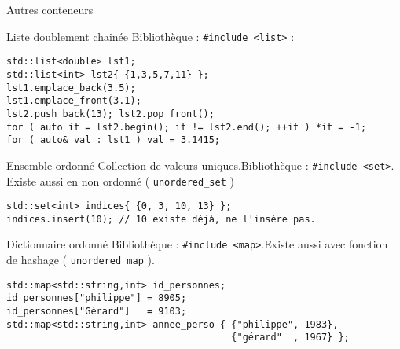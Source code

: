 \documentclass[handout,10pt]{beamer}
\begin{document}
\begin{frame}[fragile]{Autres conteneurs}
\tiny
\begin{block}{Liste doublement chainée}
Bibliothèque : \lstinline{#include <list>} :
\begin{lstlisting}
std::list<double> lst1;
std::list<int> lst2{ {1,3,5,7,11} };
lst1.emplace_back(3.5);
lst1.emplace_front(3.1);
lst2.push_back(13); lst2.pop_front();
for ( auto it = lst2.begin(); it != lst2.end(); ++it ) *it = -1;
for ( auto& val : lst1 ) val = 3.1415;
\end{lstlisting}
\end{block}

\begin{block}{Ensemble ordonné}
Collection de valeurs uniques.Bibliothèque : \lstinline{#include <set>}. Existe aussi en non ordonné ( \lstinline$unordered_set$ )
\begin{lstlisting}
std::set<int> indices{ {0, 3, 10, 13} };
indices.insert(10); // 10 existe déjà, ne l'insère pas.
\end{lstlisting}
\end{block}

\begin{block}{Dictionnaire ordonné}
Bibliothèque : \lstinline{#include <map>}.Existe aussi avec fonction de hashage ( \lstinline$unordered_map$ ).
\begin{lstlisting}
std::map<std::string,int> id_personnes;
id_personnes["philippe"] = 8905;
id_personnes["Gérard"]   = 9103;
std::map<std::string,int> annee_perso { {"philippe", 1983},
                                        {"gérard"  , 1967} };
\end{lstlisting}
\end{block}
\end{frame}
\end{document}
